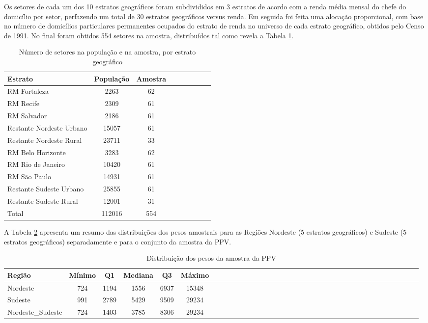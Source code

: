 \documentclass[]{book}
\theoremstyle{definition}
\theoremstyle{definition}
\theoremstyle{remark}
\begin{document}
Os setores de cada um dos 10 estratos geográficos foram subdivididos em
3 estratos de acordo com a renda média mensal do chefe do domicílio por
setor, perfazendo um total de 30 estratos geográficos versus renda. Em
seguida foi feita uma alocação proporcional, com base no número de
domicílios particulares permanentes ocupados do estrato de renda no
universo de cada estrato geográfico, obtidos pelo Censo de 1991. No
final foram obtidos 554 setores na amostra, distribuídos tal como revela
a Tabela \ref{tab:numset}.

\begin{table}

\caption{\label{tab:numset}Número de setores na população e na amostra, por estrato geográfico}
\centering
\begin{tabular}[t]{lcclcclcc}
\toprule
Estrato & População & Amostra\\
\midrule
RM Fortaleza & 2263 & 62\\
RM Recife & 2309 & 61\\
RM Salvador & 2186 & 61\\
Restante Nordeste Urbano & 15057 & 61\\
Restante Nordeste Rural & 23711 & 33\\
\addlinespace
RM Belo Horizonte & 3283 & 62\\
RM Rio de Janeiro & 10420 & 61\\
RM São Paulo & 14931 & 61\\
Restante Sudeste Urbano & 25855 & 61\\
Restante Sudeste Rural & 12001 & 31\\
Total & 112016 & 554\\
\bottomrule
\end{tabular}
\end{table}

A Tabela \ref{tab:dispesos} apresenta um resumo das distribuições dos
pesos amostrais para as Regiões Nordeste (5 estratos geográficos) e
Sudeste (5 estratos geográficos) separadamente e para o conjunto da
amostra da PPV.

\begin{table}

\caption{\label{tab:dispesos}Distribuição dos pesos da amostra da PPV}
\centering
\begin{tabular}[t]{lccccclccccclccccclccccclccccclccccc}
\toprule
Região & Mínimo & Q1 & Mediana & Q3 & Máximo\\
\midrule
Nordeste & 724 & 1194 & 1556 & 6937 & 15348\\
Sudeste & 991 & 2789 & 5429 & 9509 & 29234\\
Nordeste\_Sudeste & 724 & 1403 & 3785 & 8306 & 29234\\
\bottomrule
\end{tabular}
\end{table}
\end{document}
